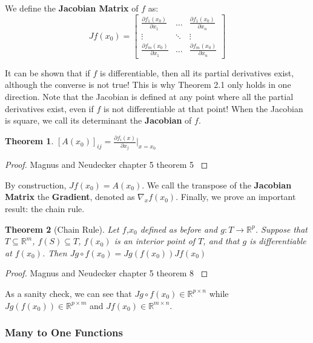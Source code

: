 \documentclass[]{article}
\theoremstyle{mattstyle}
\newtheorem{theorem}{Theorem}[section]
\theoremstyle{definition}
\begin{document}
We define the \textbf{Jacobian Matrix} of $f$ as:
$$ Jf(x_0) =  \begin{bmatrix}
\frac{\partial f_1(x_0)}{\partial x_1} & \dots  & \frac{\partial f_1(x_0)}{\partial x_n} \\
\vdots & \ddots & \vdots \\
\frac{\partial f_m(x_0)}{\partial x_1} & \dots  & \frac{\partial f_m(x_0)}{\partial x_n}
\end{bmatrix}$$

It can be shown that if $f$ is differentiable, then all its partial derivatives exist, although the converse is not true! This is why Theorem 2.1 only holds in one direction. Note that the Jacobian is defined at any point where all the partial derivatives exist, even if $f$ is not differentiable at that point! When the Jacobian is square, we call its determinant the \textbf{Jacobian} of $f$.

\begin{theorem}
	$[A(x_0)]_{ij} = \frac{\partial f_i(x)}{\partial x_j}\Bigr\rvert_{x=x_{0}}$
\end{theorem} 
\begin{proof}
	Magnus and Neudecker chapter 5 theorem 5 \cite{magnus1988matrix}
\end{proof}

By construction, $Jf(x_0) = A(x_0)$. We call the transpose of the \textbf{Jacobian Matrix} the \textbf{Gradient}, denoted as $\nabla_x f(x_0)$. Finally, we prove an important result: the chain rule.
\begin{theorem}[Chain Rule]
	Let $f$,$x_0$ defined as before and $g: T \rightarrow \mathbb{R}^p$. Suppose that $T \subseteq \mathbb{R}^m$, $f(S) \subseteq T$, $f(x_0)$ is an interior point of $T$, and that $g$ is differentiable at $f(x_0)$. Then $Jg \circ f(x_0) = Jg(f(x_0))Jf(x_0)$
\end{theorem} 
\begin{proof}
	Magnus and Neudecker chapter 5 theorem 8 \cite{magnus1988matrix}
\end{proof}

As a sanity check, we can see that $Jg \circ f(x_0) \in \mathbb{R}^{p \times n}$ while  $Jg(f(x_0))\in \mathbb{R}^{p \times m}$ and $Jf(x_0)\in \mathbb{R}^{m\times n}$.

\subsubsection{Many to One Functions}
\end{document}
